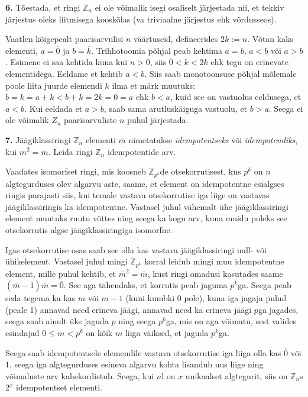 \documentclass[a4paper, 10pt]{article}
\newcommand{\Z}{\mathbb{Z}}
\newcommand{\w}{\overline}
\begin{document}
\noindent \textbf{6.} Tõestada, et ringi $\Z_n$ ei ole võimalik isegi osaliselt järjestada nii, et tekkiv järjestus oleks liitmisega kooskõlas (va triviaalne järjestus ehk võrdusseos). 

\bigskip
Vaatlen kõigepealt paarisarvulisi $n$ väärtuseid, defineerides $2k:=n$. Võtan kaks elementi, $a=\w0$ ja $b=\w k$. Trihhotoomia põhjal peab kehtima $a=b$, $a<b$ või $a>b$. Esimene ei saa kehtida kuna kui $n>0$, siis $0<k<2k$ ehk tegu on erinevate elementidega. Eeldame et kehtib $a<b$. Siis saab monotoonsuse põhjal mõlemale poole liita juurde elemendi $k$ ilma et märk muutuks: $b=k=a+k<b+k=2k=0=a$ ehk $b<a$, kuid see on vastuolus eeldusega, et $a<b$. Kui eeldada et $a>b$, saab sama arutluskäiguga vastuolu, et $b>a$. Seega ei ole võimalik $Z_n$ paarisarvuliste $n$ puhul järjestada.
\bigskip

\noindent \textbf{7.} Jäägiklassiringi $\Z_n$ elementi $\overline{m}$ nimetatakse \emph{idempotentseks} või \emph{idempotendiks}, kui $\overline{m}^2=\overline{m}$. Leida ringi $\Z_n$ idempotentide arv. 

\bigskip
Vaadates isomorfset ringi, mis koosneb $\Z_{p^k}$de otsekorrutisest, kus $p^k$ on $n$ algtegurduses olev algarvu aste, saame, et element on idempotentne esialgses ringis parajasti siis, kui temale vastava otsekorrutise iga liige on vastavas jäägiklassiringis ka idempotentne. Vastasel juhul vähemalt ühe jäägiklassiringi element muutuks ruutu võttes ning seega ka kogu arv, kuna muidu poleks see otsekorrutis algse jäägiklassiringiga isomorfne.

Igas otsekorrutise osas saab see olla kas vastava jäägiklassiringi null- või ühikelement. Vastasel juhul mingi $\Z_{p^k}$ korral leidub mingi muu idempotentne element, mille puhul kehtib, et $\overline{m}^2=\overline{m}$, kust ringi omadusi kasutades saame $(\overline{m}-\overline{1})\overline{m}=\overline{0}$. See aga tähendaks, et korrutis peab jaguma $p^k$ga. Seega peab seda tegema ka kas $m$ või $m-1$ (kuni kumbki 0 pole), kuna iga jagaja puhul (peale 1) annavad need erineva jäägi, annavad need ka erineva jäägi $p$ga jagades, seega saab ainult üks jaguda $p$ ning seega $p^k$ga, mis on aga võimatu, sest valides esindajad $0\leq m<p^k$ on kõik $m$ liiga väiksed, et jaguda $p^k$ga.

Seega saab idempotentsele elemendile vastava otsekorrutise iga liiga olla kas $\overline{0}$ või $\overline{1}$, seega iga algtegurduses esineva algarvu kohta lisandub uus liige ning võimaluste arv kahekordistub. Seega, kui $n$l on $x$ unikaalset algtegurit, siis on $\Z_n$s $2^x$ idempotentset elementi.
\bigskip
\end{document}
